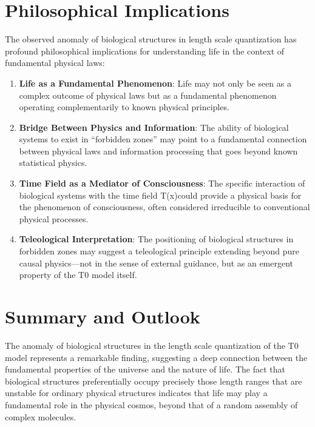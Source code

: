 \documentclass[12pt,a4paper]{article}
\newcommand{\Tfield}{T(x)}
\begin{document}
	\section{Philosophical Implications}
	
	The observed anomaly of biological structures in length scale quantization has profound philosophical implications for understanding life in the context of fundamental physical laws:
	
	\begin{enumerate}
		\item \textbf{Life as a Fundamental Phenomenon}: Life may not only be seen as a complex outcome of physical laws but as a fundamental phenomenon operating complementarily to known physical principles.
		
		\item \textbf{Bridge Between Physics and Information}: The ability of biological systems to exist in ``forbidden zones'' may point to a fundamental connection between physical laws and information processing that goes beyond known statistical physics.
		
		\item \textbf{Time Field as a Mediator of Consciousness}: The specific interaction of biological systems with the time field \Tfield could provide a physical basis for the phenomenon of consciousness, often considered irreducible to conventional physical processes.
		
		\item \textbf{Teleological Interpretation}: The positioning of biological structures in forbidden zones may suggest a teleological principle extending beyond pure causal physics—not in the sense of external guidance, but as an emergent property of the T0 model itself.
	\end{enumerate}
	
	\section{Summary and Outlook}
	
	The anomaly of biological structures in the length scale quantization of the T0 model represents a remarkable finding, suggesting a deep connection between the fundamental properties of the universe and the nature of life. The fact that biological structures preferentially occupy precisely those length ranges that are unstable for ordinary physical structures indicates that life may play a fundamental role in the physical cosmos, beyond that of a random assembly of complex molecules.
	
\end{document}
